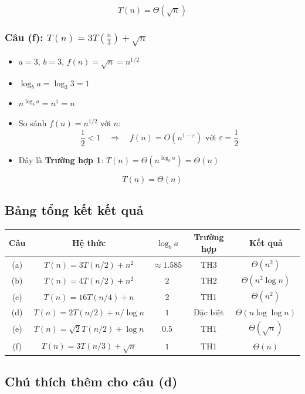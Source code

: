 \documentclass{article}
\begin{document}
\[
\boxed{T(n) = \Theta(\sqrt{n})}
\]

\subsubsection{Câu (f): \( T(n) = 3T\left(\frac{n}{3}\right) + \sqrt{n} \)}

\begin{itemize}
    \item \(a = 3\), \(b = 3\), \(f(n) = \sqrt{n} = n^{1/2}\)
    \item \(\log_b a = \log_3 3 = 1\)
    \item \(n^{\log_b a} = n^1 = n\)
    \item So sánh \(f(n) = n^{1/2}\) với \(n\):
    \[
    \frac{1}{2} < 1 \quad \Rightarrow \quad f(n) = O\left(n^{1 - \varepsilon}\right) \text{ với } \varepsilon = \frac{1}{2}
    \]
    \item Đây là \textbf{Trường hợp 1}: \(T(n) = \Theta(n^{\log_b a}) = \Theta(n)\)
\end{itemize}

\[
\boxed{T(n) = \Theta(n)}
\]

\subsection{Bảng tổng kết kết quả}

\begin{tabular}{|c|c|c|c|c|}
\hline
\textbf{Câu} & \textbf{Hệ thức} & \(\log_b a\) & \textbf{Trường hợp} & \textbf{Kết quả} \\
\hline
(a) & \(T(n) = 3T(n/2) + n^2\) & \(\approx 1.585\) & TH3 & \(\Theta(n^2)\) \\
\hline
(b) & \(T(n) = 4T(n/2) + n^2\) & \(2\) & TH2 & \(\Theta(n^2 \log n)\) \\
\hline
(c) & \(T(n) = 16T(n/4) + n\) & \(2\) & TH1 & \(\Theta(n^2)\) \\
\hline
(d) & \(T(n) = 2T(n/2) + n/\log n\) & \(1\) & Đặc biệt & \(\Theta(n \log \log n)\) \\
\hline
(e) & \(T(n) = \sqrt{2}T(n/2) + \log n\) & \(0.5\) & TH1 & \(\Theta(\sqrt{n})\) \\
\hline
(f) & \(T(n) = 3T(n/3) + \sqrt{n}\) & \(1\) & TH1 & \(\Theta(n)\) \\
\hline
\end{tabular}

\subsection{Chú thích thêm cho câu (d)}
\end{document}
